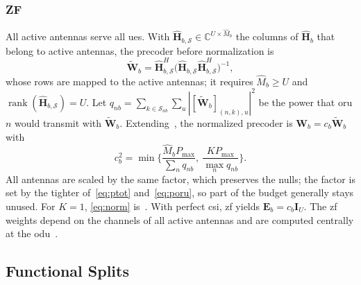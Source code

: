 \documentclass[10pt, final, journal, letterpaper, twocolumn]{IEEEtran}
\newcommand{\Pmax}{P_{\max}}
\newcommand{\bHh}{\hat{\mathbf{H}}}
\newcommand{\bW}{\mathbf{W}}
\newcommand{\bWt}{\tilde{\mathbf{W}}}
\newcommand{\bE}{\mathbf{E}}
\begin{document}
\subsubsection{ZF}
All active antennas serve all \glspl{ue}. With $\bHh_{b,\mathcal{S}} \in \mathbb{C}^{U \times \hat{M}_b}$ the columns of $\bHh_b$ that belong to active antennas, the precoder before normalization is
\begin{equation}
  \bWt_b = \bHh_{b,\mathcal{S}}^H \big( \bHh_{b,\mathcal{S}} \bHh_{b,\mathcal{S}}^H \big)^{-1},
  \label{eq:zf}
\end{equation}
whose rows are mapped to the active antennas; it requires $\hat{M}_b \ge U$ and $\operatorname{rank}(\bHh_{b,\mathcal{S}}) = U$. Let $q_{nb} = \sum_{k \in \mathcal{S}_{nb}} \sum_{u} |[\bWt_b]_{(n,k),u}|^2$ be the power that \gls{oru} $n$ would transmit with $\bWt_b$. Extending~\cite[eq.~(18)]{girycki2024twc}, the normalized precoder is $\bW_b = c_b \bWt_b$ with
\begin{equation}
  c_b^2 = \min\bigg\{ \frac{\hat{M}_b \Pmax}{\sum_{n} q_{nb}},\ \frac{K \Pmax}{\max_{n} q_{nb}} \bigg\}.
  \label{eq:norm}
\end{equation}
All antennas are scaled by the same factor, which preserves the nulls; the factor is set by the tighter of~\eqref{eq:ptot} and~\eqref{eq:poru}, so part of the budget generally stays unused. For $K = 1$, \eqref{eq:norm} is~\cite[eq.~(18)]{girycki2024twc}. With perfect \gls{csi}, \gls{zf} yields $\bE_b = c_b \mathbf{I}_U$. The \gls{zf} weights depend on the channels of all active antennas and are computed centrally at the \gls{odu}~\cite{girycki2024eucnc}.

\subsection{Functional Splits}\label{sec:splits}
\end{document}
